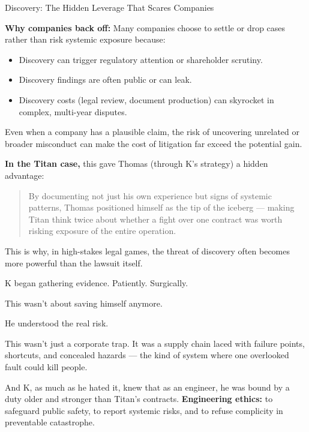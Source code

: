 \begin{HistoricalSidebar}{Discovery: The Hidden Leverage That Scares Companies}
    \medskip
    
    \textbf{Why companies back off:} Many companies choose to settle or drop cases rather than risk systemic exposure because:

    \medskip

    \begin{itemize}
        \item Discovery can trigger regulatory attention or shareholder scrutiny.
        \item Discovery findings are often public or can leak.
        \item Discovery costs (legal review, document production) can skyrocket in complex, multi-year disputes.
    \end{itemize}

    \medskip
    
    Even when a company has a plausible claim, the risk of uncovering unrelated or broader misconduct can make the cost of litigation far exceed the potential gain.
    
    \medskip
    
    \textbf{In the Titan case,} this gave Thomas (through K’s strategy) a hidden advantage:

    \medskip

    \begin{quote}
        By documenting not just his own experience but signs of systemic patterns,  
        Thomas positioned himself as the tip of the iceberg —  
        making Titan think twice about whether a fight over one contract was worth risking exposure of the entire operation.
    \end{quote}
    
    This is why, in high-stakes legal games, the threat of discovery often becomes more powerful than the lawsuit itself.
    
\end{HistoricalSidebar}

\medskip

K began gathering evidence.
Patiently.
Surgically.

This wasn’t about saving himself anymore.

He understood the real risk.

This wasn’t just a corporate trap.
It was a supply chain laced with failure points, shortcuts, and concealed hazards —
the kind of system where one overlooked fault could kill people.

And K, as much as he hated it, knew that as an engineer, he was bound by a duty older and stronger than Titan’s contracts.
\textbf{Engineering ethics:} to safeguard public safety, to report systemic risks, and to refuse complicity in preventable catastrophe.

